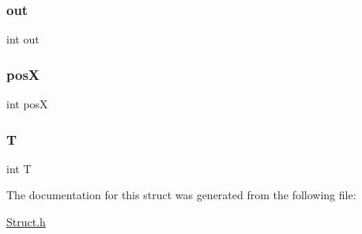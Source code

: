 \subsubsection{\texorpdfstring{out}{out}}
{\footnotesize\ttfamily int out}

\mbox{\label{struct_horse_ab34f89ef94db9dd6d3a04425dd6d9c9d}} 
\subsubsection{\texorpdfstring{posX}{posX}}
{\footnotesize\ttfamily int posX}

\mbox{\label{struct_horse_a94960b2af438191aca84d0ea3a690af3}} 
\subsubsection{\texorpdfstring{T}{T}}
{\footnotesize\ttfamily int T}



The documentation for this struct was generated from the following file\+:\begin{DoxyCompactItemize}
\item 
\hyperlink{_struct_8h}{Struct.\+h}\end{DoxyCompactItemize}
